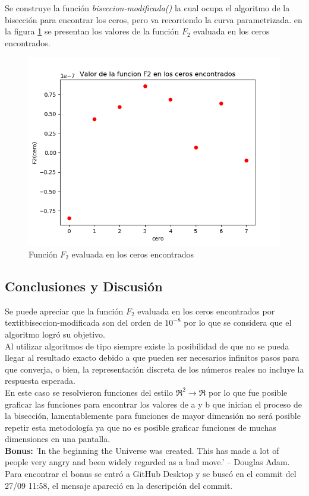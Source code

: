 \documentclass[a4paper, 11pt, spanish]{article}
\begin{document}
Se construye la función \textit{biseccion-modificada()} la cual ocupa el algoritmo de la bisección para encontrar los ceros, pero va recorriendo la curva parametrizada. en la figura \ref{ceros} se presentan los valores de la función $F_2$ evaluada en los ceros encontrados.

\begin{figure}[h]
\centering
\includegraphics[scale=0.5]{ajuste.png}
\caption{Función $F_2$ evaluada en los ceros encontrados} 
\label{ceros}
\end{figure}

\subsection{Conclusiones y Discusi\'on}

Se puede apreciar que la función $F_2$ evaluada en los ceros encontrados por textit{biseccion-modificada}  son del orden de $10^{-8}$ por lo que se considera que el algoritmo logró su objetivo.\\
Al utilizar algoritmos de tipo siempre existe la posibilidad de que no se pueda llegar al resultado exacto debido a que pueden ser necesarios infinitos pasos para que converja, o bien, la representación discreta de los números reales no incluye la respuesta esperada.\\ 
En este caso se resolvieron funciones del estilo $\Re^2 \rightarrow \Re$ por lo que fue posible graficar las funciones para encontrar los valores de a y b que inician el proceso de la bisección, lamentablemente para funciones de mayor dimensión no será posible repetir esta metodología ya que no es posible graficar funciones de muchas dimensiones en una pantalla.\\
\textbf{Bonus:} 'In the beginning the Universe was created. This has made a lot of
people very angry and been widely regarded as a bad move.' -- Douglas Adam. \\
Para encontrar el bonus se entró a GitHub Desktop y se buscó en el commit del 27/09 11:58, el mensaje apareció en la descripción del commit.
\end{document}
